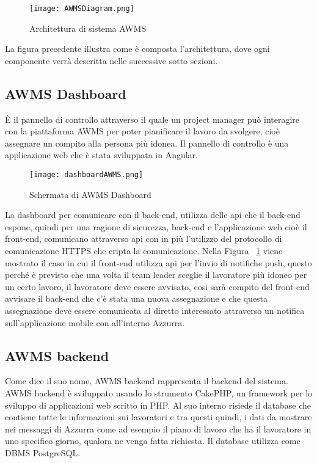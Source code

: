  \begin{figure}[h]
 	\begin{center}
 		\texttt{[image: AWMSDiagram.png]}
 		\caption{Architettura di sistema AWMS}\label{fig:arch}
 	\end{center}
 \end{figure}
La figura precedente illustra come è composta l'architettura, dove ogni componente verrà descritta nelle successive sotto sezioni.
\begin{trivlist}
	\item \subsection{AWMS Dashboard}
	È il pannello di controllo attraverso il quale un project manager può interagire con la piattaforma AWMS per poter pianificare il lavoro da svolgere, cioè assegnare un compito alla persona più idonea. Il pannello di controllo è una applicazione web che è stata sviluppata in Angular.
	\begin{figure}[h] 
		\begin{center}
			\texttt{[image: dashboardAWMS.png]}
			\caption{Schermata di AWMS Dashboard}
		\end{center}
	\end{figure}
	 	La dashboard per comunicare con il back-end, utilizza delle \gls{api} che il back-end espone, quindi per una ragione di sicurezza, back-end e l'applicazione web cioè il front-end, comunicano attraverso \gls{api} con in più l'utilizzo del protocollo di comunicazione HTTPS che cripta la comunicazione. Nella Figura ~\ref{fig:arch} viene mostrato il caso in cui il front-end utilizza \gls{api} per l'invio di notifiche push, questo perché è previsto che una volta il team leader sceglie il lavoratore più idoneo per un certo lavoro, il lavoratore deve essere avvisato, cosi sarà compito del front-end avvisare il back-end che c'è stata una nuova assegnazione e che questa assegnazione deve essere comunicata al diretto interessato attraverso un notifica sull'applicazione mobile con all'interno Azzurra.
	\item \subsection{AWMS backend}
	Come dice il suo nome, AWMS backend rappresenta il backend del sistema. AWMS backend è sviluppato usando lo strumento CakePHP, un framework per lo sviluppo di applicazioni web scritto in PHP. Al suo interno risiede il database che contiene tutte le informazioni sui lavoratori e tra questi quindi, i dati da mostrare nei messaggi di Azzurra come ad esempio il piano di lavoro che ha il lavoratore in uno specifico giorno, qualora ne venga fatta richiesta. Il database utilizza come DBMS PostgreSQL. \\

\end{trivlist}
